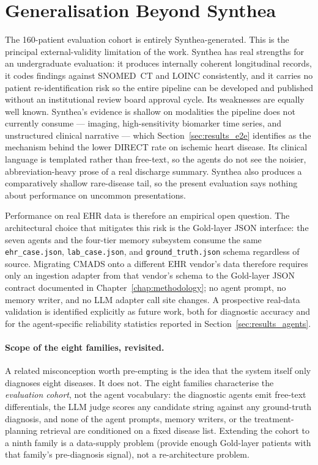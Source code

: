 \section{Generalisation Beyond Synthea}
\label{sec:discussion_generalisation}

The 160-patient evaluation cohort is entirely Synthea-generated. This
is the principal external-validity limitation of the work. Synthea
has real strengths for an undergraduate evaluation: it produces
internally coherent longitudinal records, it codes findings against
SNOMED~CT and LOINC consistently, and it carries no patient
re-identification risk so the entire pipeline can be developed and
published without an institutional review board approval cycle. Its
weaknesses are equally well known. Synthea's evidence is shallow on
modalities the pipeline does not currently consume --- imaging,
high-sensitivity biomarker time series, and unstructured clinical
narrative --- which Section~\ref{sec:results_e2e} identifies as the
mechanism behind the lower DIRECT rate on ischemic heart disease.
Its clinical language is templated rather than free-text, so the
agents do not see the noisier, abbreviation-heavy prose of a real
discharge summary. Synthea also produces a comparatively shallow
rare-disease tail, so the present evaluation says nothing about
performance on uncommon presentations.

Performance on real EHR data is therefore an empirical open question.
The architectural choice that mitigates this risk is the
Gold-layer JSON interface: the seven agents and the four-tier memory
subsystem consume the same
\texttt{ehr\_case.json}, \texttt{lab\_case.json}, and
\texttt{ground\_truth.json} schema regardless of source. Migrating
CMADS onto a different EHR vendor's data therefore requires only an
ingestion adapter from that vendor's schema to the Gold-layer JSON
contract documented in Chapter~\ref{chap:methodology}; no agent
prompt, no memory writer, and no LLM adapter call site changes. A
prospective real-data validation is identified explicitly as future
work, both for diagnostic accuracy and for the agent-specific
reliability statistics reported in
Section~\ref{sec:results_agents}.

\paragraph{Scope of the eight families, revisited.} A related
misconception worth pre-empting is the idea that the system itself
only diagnoses eight diseases. It does not. The eight families
characterise the \emph{evaluation cohort}, not the agent vocabulary:
the diagnostic agents emit free-text differentials, the LLM judge
scores any candidate string against any ground-truth diagnosis, and
none of the agent prompts, memory writers, or the treatment-planning
retrieval are conditioned on a fixed disease list. Extending the
cohort to a ninth family is a data-supply problem (provide enough
Gold-layer patients with that family's pre-diagnosis signal), not a
re-architecture problem.

